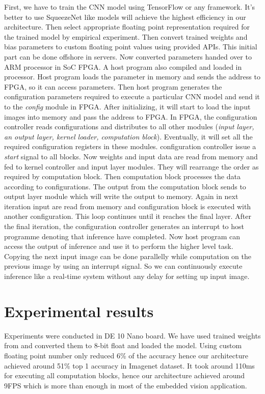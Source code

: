 \documentclass[conference]{IEEEtran}
\begin{document}
First, we have to train the CNN model using TensorFlow or any framework. It's better to use SqueezeNet like models will achieve the highest efficiency in our architecture. Then select appropriate floating point representation required for the trained model by empirical experiment. Then convert trained weights and bias parameters to custom floating point values using provided APIs. This initial part can be done offshore in servers. Now converted parameters handed over to ARM processor in SoC FPGA. A host program also compiled and loaded in processor. Host program loads the parameter in memory and sends the address to FPGA, so it can access parameters. Then host program generates the configuration parameters required to execute a particular CNN model and send it to the \textit{config} module in FPGA. After initializing, it will start to load the input images into memory and pass the address to FPGA. 
In FPGA, the configuration controller reads configurations and distributes to all other modules (\textit{input layer, an output layer, kernel loader, computation block}). Eventually, it will set all the required configuration registers in these modules. configuration controller issue a \textit{start} signal to all blocks. Now weights and input data are read from memory and fed to kernel controller and input layer modules. They will rearrange the order as required by computation block. Then computation block processes the data according to configurations. The output from the computation block sends to output layer module which will write the output to memory. Again in next iteration input are read from memory and configuration block is executed with another configuration. This loop continues until it reaches the final layer. After the final iteration, the configuration controller generates an interrupt to host programme denoting that inference have completed. Now host program can access the output of inference and use it to perform the higher level task. Copying the next input image can be done parallelly while computation on the previous image by using an interrupt signal. So we can continuously execute inference like a real-time system without any delay for setting up input image.


\section{Experimental results}\label{SCM}


Experiments were conducted in DE 10 Nano board. We have used trained weights from \cite{weight} and converted them to 8-bit float and loaded the model. Using custom floating point number only reduced 6\% of the accuracy hence our architecture achieved around 51\% top 1 accuracy in Imagenet dataset. It took around 110ms for executing all computation blocks, hence our architecture achieved around 9FPS which is more than enough in most of the embedded vision application.
\end{document}
